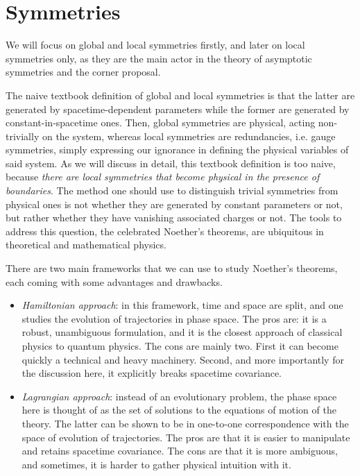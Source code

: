 \section{Symmetries}
 We will focus on global and local symmetries firstly, and later on local symmetries only, as they are the main actor in the theory of asymptotic symmetries and the corner proposal.
 
 The naive textbook definition of global and local symmetries is that the latter are generated by spacetime-dependent parameters while the former are generated by constant-in-spacetime ones. Then, global symmetries are physical, acting non-trivially on the system, whereas local symmetries are redundancies, i.e. gauge symmetries, simply expressing our ignorance in defining the physical variables of said system. As we will discuss in detail, this textbook definition is too naive, because \textit{there are local symmetries that become physical in the presence of boundaries}. The method one should use to distinguish trivial symmetries from physical ones is not whether they are generated by constant parameters or not, but rather whether they have vanishing associated charges or not. The tools to address this question, the celebrated Noether’s theorems, are ubiquitous in theoretical and mathematical physics.
 
 There are two main frameworks that we can use to study Noether’s theorems, each coming with some advantages and drawbacks.
 
 \begin{itemize}
 	\item \textit{Hamiltonian approach}: in this framework, time and space are split, and one studies the evolution of trajectories in phase space. The pros are: it is a robust, unambiguous formulation, and it is the closest approach of classical physics to quantum physics. The cons are mainly two. First it can become quickly a technical and heavy machinery. Second, and more importantly for the discussion here, it explicitly breaks spacetime covariance.
 	\item \textit{Lagrangian approach}: instead of an evolutionary problem, the phase space here is thought of as the set of solutions to the equations of motion of the theory. The latter can be shown to be in one-to-one correspondence with the space of evolution of trajectories. The pros are that it is easier to manipulate and retains spacetime covariance. The cons are that it is more ambiguous, and sometimes, it is harder to gather physical intuition with it.
 \end{itemize}
 
